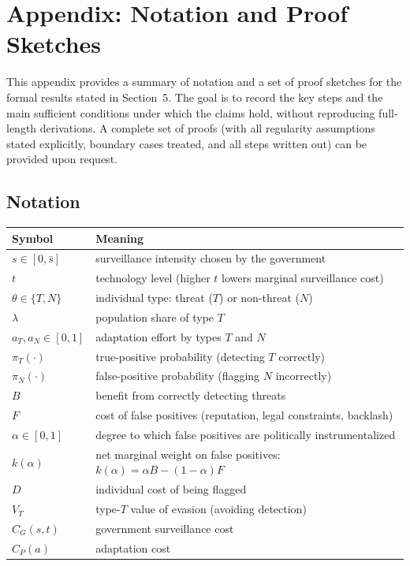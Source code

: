 \documentclass[11pt,a4paper]{article}
\theoremstyle{definition}
\theoremstyle{remark}
\theoremstyle{definition}
\begin{document}
\newpage
\appendix
\section{Appendix: Notation and Proof Sketches}

This appendix provides a summary of notation and a set of proof sketches for the formal results stated in Section~5. The goal is to record the
key steps and the main sufficient conditions under which the claims hold, without reproducing full-length derivations. A complete set of proofs
(with all regularity assumptions stated explicitly, boundary cases treated, and all steps written out) can be provided upon request.

\subsection{Notation}
\begin{center}
\begin{tabular}{@{}ll@{}}
\toprule
Symbol & Meaning \\
\midrule
$s \in [0,\bar s]$ & surveillance intensity chosen by the government \\
$t$ & technology level (higher $t$ lowers marginal surveillance cost) \\
$\theta \in \{T,N\}$ & individual type: threat ($T$) or non-threat ($N$) \\
$\lambda$ & population share of type $T$ \\
$a_T,a_N \in [0,1]$ & adaptation effort by types $T$ and $N$ \\
$\pi_T(\cdot)$ & true-positive probability (detecting $T$ correctly) \\
$\pi_N(\cdot)$ & false-positive probability (flagging $N$ incorrectly) \\
$B$ & benefit from correctly detecting threats \\
$F$ & cost of false positives (reputation, legal constraints, backlash) \\
$\alpha \in [0,1]$ & degree to which false positives are politically instrumentalized \\
$k(\alpha)$ & net marginal weight on false positives: $k(\alpha)=\alpha B-(1-\alpha)F$ \\
$D$ & individual cost of being flagged \\
$V_T$ & type-$T$ value of evasion (avoiding detection) \\
$C_G(s,t)$ & government surveillance cost \\
$C_P(a)$ & adaptation cost \\
\bottomrule
\end{tabular}
\end{center}
\end{document}
